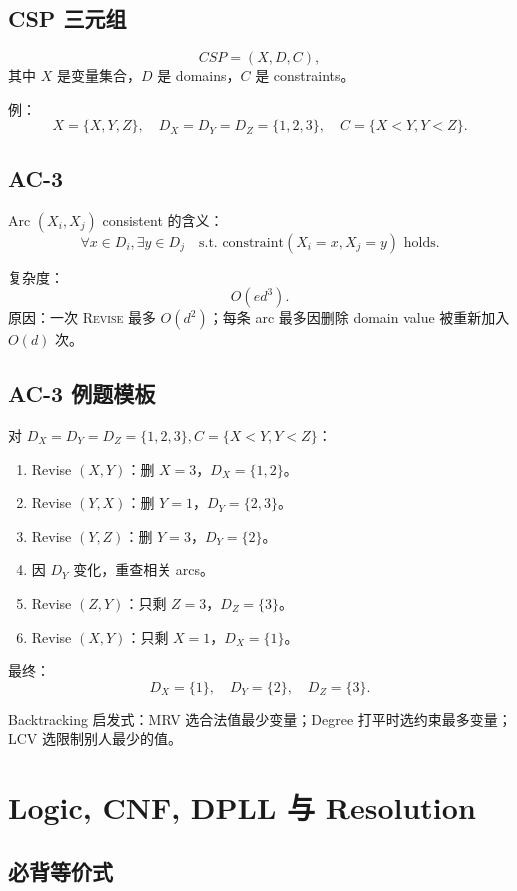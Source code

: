 \documentclass[UTF8,11pt,a4paper]{ctexart}
\begin{document}
\subsection{CSP 三元组}

\[
CSP=(X,D,C),
\]
其中 $X$ 是变量集合，$D$ 是 domains，$C$ 是 constraints。

例：
\[
X=\{X,Y,Z\},\quad D_X=D_Y=D_Z=\{1,2,3\},\quad
C=\{X<Y,Y<Z\}.
\]

\subsection{AC-3}

Arc $(X_i,X_j)$ consistent 的含义：
\[
\forall x\in D_i,\exists y\in D_j\quad \text{s.t. constraint}(X_i=x,X_j=y)\text{ holds}.
\]

复杂度：
\[
\boxed{O(ed^3)}.
\]
原因：一次 \textsc{Revise} 最多 $O(d^2)$；每条 arc 最多因删除 domain value 被重新加入 $O(d)$ 次。

\subsection{AC-3 例题模板}

对 $D_X=D_Y=D_Z=\{1,2,3\}, C=\{X<Y,Y<Z\}$：
\begin{enumerate}
\item Revise $(X,Y)$：删 $X=3$，$D_X=\{1,2\}$。
\item Revise $(Y,X)$：删 $Y=1$，$D_Y=\{2,3\}$。
\item Revise $(Y,Z)$：删 $Y=3$，$D_Y=\{2\}$。
\item 因 $D_Y$ 变化，重查相关 arcs。
\item Revise $(Z,Y)$：只剩 $Z=3$，$D_Z=\{3\}$。
\item Revise $(X,Y)$：只剩 $X=1$，$D_X=\{1\}$。
\end{enumerate}
最终：
\[
D_X=\{1\},\quad D_Y=\{2\},\quad D_Z=\{3\}.
\]

Backtracking 启发式：MRV 选合法值最少变量；Degree 打平时选约束最多变量；LCV 选限制别人最少的值。

\section{Logic, CNF, DPLL 与 Resolution}

\subsection{必背等价式}
\end{document}

